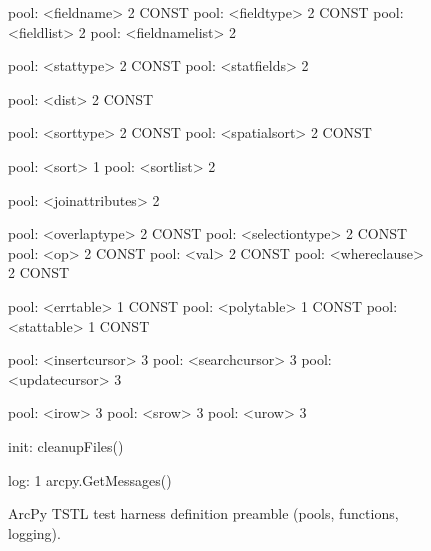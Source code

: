 \begin{figure}
{\begin{code}
pool: <fieldname> 2 CONST
pool: <fieldtype> 2 CONST
pool: <fieldlist> 2
pool: <fieldnamelist> 2

pool: <stattype> 2 CONST
pool: <statfields> 2

pool: <dist> 2 CONST

pool: <sorttype> 2 CONST
pool: <spatialsort> 2 CONST

pool: <sort> 1
pool: <sortlist> 2

pool: <joinattributes> 2

pool: <overlaptype> 2 CONST
pool: <selectiontype> 2 CONST
pool: <op> 2 CONST
pool: <val> 2 CONST
pool: <whereclause> 2 CONST

pool: <errtable> 1 CONST
pool: <polytable> 1 CONST
pool: <stattable> 1 CONST

pool: <insertcursor> 3
pool: <searchcursor> 3
pool: <updatecursor> 3

pool: <irow> 3
pool: <srow> 3
pool: <urow> 3

init: cleanupFiles()

log: 1 arcpy.GetMessages()
\end{code}
}
\caption{ArcPy TSTL test harness definition preamble (pools, functions, logging).}
\label{preamble}
\end{figure}


